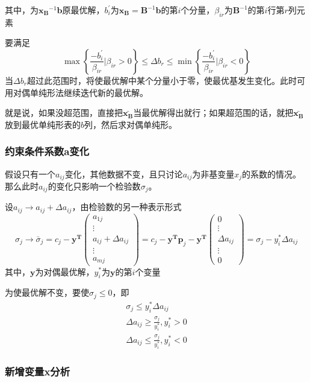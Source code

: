 \documentclass{book}
\begin{document}
其中，为$\boldsymbol{x_B}^{-1}\boldsymbol{b}$原最优解，$b_i^{\prime}$为$\boldsymbol{x_B}=\boldsymbol{B}^{-1}\boldsymbol{b}$的第$i$个分量，$\beta_{ir}$为$\boldsymbol{B}^{-1}$的第$i$行第$r$列元素

要满足$$\max\left\{ \frac{-b_i^{\prime}}{\beta_{ir}}|\beta_{ir}>0 \right\}\le\Delta b_r\le\min\left\{ \frac{-b_i^{\prime}}{\beta_{ir}}|\beta_{ir}<0 \right\}$$当$\Delta b_r$超过此范围时，将使最优解中某个分量小于零，使最优基发生变化。此时可用对偶单纯形法继续迭代新的最优解。

就是说，如果没超范围，直接把$\boldsymbol{\bar{x_B}}$当最优解得出就行；如果超范围的话，就把$\boldsymbol{\bar{x_B}}$放到最优单纯形表的$b$列，然后求对偶单纯形。

\subsubsection{约束条件系数a变化}
假设只有一个$a_{ij}$变化，其他数据不变，且只讨论$a_{ij}$为非基变量$x_j$的系数的情况。那么此时$a_{ij}$的变化只影响一个检验数$\sigma_j$。

设$a_{ij}\rightarrow a_{ij}+\Delta a_{ij}$，由检验数的另一种表示形式$$\sigma_j\rightarrow\bar{\sigma}_j=c_j-\boldsymbol{y^T}
    \begin{pmatrix}a_{1j}\\ \vdots\\ a_{ij}+\Delta a_{ij}\\ \vdots\\ a_{mj}\end{pmatrix}=c_j-\boldsymbol{y^Tp}_j-\boldsymbol{y^T}\begin{pmatrix}0\\ \vdots\\ \Delta a_{ij}\\ \vdots\\ 0 \end{pmatrix}=\sigma_j-y_i^*\Delta a_{ij}$$其中，$\boldsymbol{y}$为对偶最优解，$y_i^*$为$\boldsymbol{y}$的第$i$个变量

为使最优解不变，要使$\sigma_j\le0$，即\begin{align*}
    \sigma_j\le y_i^*\Delta a_{ij}                 \\
    \Delta a_{ij}\ge\frac{\sigma_j}{y_i^*},y^*_i>0 \\
    \Delta a_{ij}\le\frac{\sigma_j}{y^*_i},y^*_i<0
\end{align*}

\subsubsection{新增变量x分析}
\end{document}
